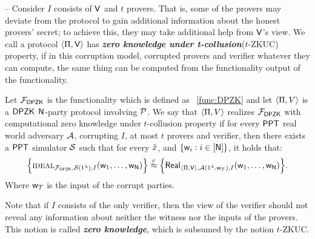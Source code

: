 -- Consider $I$ consists of $\mathsf{V}$ and $t$ provers. That is, some of the provers may deviate from the protocol to gain additional information about the honest provers' secret; to achieve this, they may take additional help from $\mathsf{V}$'s view. We call a protocol $\langle \Pi,\mathsf{V}\rangle$ has \textbf{\textit{zero knowledge under t-collusion}}($t$-ZKUC) property, if in this corruption model, corrupted provers and verifier whatever they can compute, the same thing can be computed from the functionality output of the functionality. 
	\begin{definition}
		Let $\mathcal{F}_{\mathsf{DPZK}}$ is the functionality which is defined as ~\ref{func:DPZK} and let $\langle \Pi,V\rangle$ is a $\mathsf{DPZK}$ $\mathsf{N}$-party protocol involving $\mathcal{P}$. We say that $\langle \Pi,V\rangle$ realizes $\mathcal{F}_{\mathsf{DPZK}}$ with computational zero knowledge under $t$-collusion property if for every $\mathsf{PPT}$ real world adversary $\mathcal{A}$, corrupting $I$, at most $t$ provers and verifier, then there exists a $\mathsf{PPT}$ simulator $\mathcal{S}$ such that for every $\hat{x}$, and $\{\mathsf{w}_i : i\in [\mathsf{N}]\}$, it holds that: 
		$$\Big\{\textsc{ideal}_{\mathcal{F}_{\mathsf{DPZK}}, \mathcal{S}(1^{\lambda}),I}(\mathsf{w}_1, \ldots, \mathsf{w}_{\mathsf{N}}) \Big\} \stackrel{c}{\approx} \Big\{ \mathsf{Real}_{\langle \Pi,\mathsf{V}\rangle, \mathcal{A}(1^{\lambda}, \mathsf{w}_T),I}(\mathsf{w}_1, \ldots, \mathsf{w}_{\mathsf{N}}) \Big\}. $$
		Where $\mathsf{w}_T$ is the input of the corrupt parties.
	\end{definition}

Note that if $I$ consists of the only verifier, then the view of the verifier should not reveal any information about neither the witness nor the inputs of the provers. This notion is called \textbf{\textit{zero knowledge}}, which is subsumed by the notion $t$-ZKUC.
